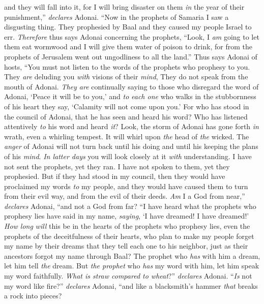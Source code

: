 \begin{biblechapter}
and they will fall into it, 
for I will bring disaster on them \textit{in} the year of their punishment,” \textit{declares} Adonai.
\verse “Now in the prophets of Samaria I saw a disgusting thing. 
They prophesied by Baal and they caused my people Israel to err.
\verse \textit{Therefore} thus says Adonai concerning the prophets, “Look, I \textit{am} going to let them eat wormwood 
and I will give them water of poison to drink, 
for from the prophets of Jerusalem 
went out ungodliness to all the land.”
\verse Thus says Adonai of hosts,
\verse “You must not listen to the words of the prophets who prophesy to you. 
They \textit{are} deluding you \textit{with} visions of their \textit{mind}, 
They do not speak from the mouth of Adonai.
\verse \textit{They are} continually saying to those who disregard the word of Adonai, 
‘Peace it will be to you,’ 
and \textit{to} \textit{each one} who walks in the stubbornness of his heart they say, 
‘Calamity will not come upon you.’
\verse For who has stood in the council of Adonai, 
that he has seen and heard his word? 
Who has listened attentively \textit{to} his word 
and heard \textit{it}?
\verse Look, the storm of Adonai has gone forth \textit{in} wrath, 
even a whirling tempest. 
It will whirl upon \textit{the} head of \textit{the} wicked.
\verse The \textit{anger} of Adonai will not turn back 
until his doing and until his keeping the plans of his \textit{mind}. 
\textit{In latter days} you will look closely at it \textit{with} understanding.
\verse I have not sent the prophets, yet they ran. 
I have not spoken to them, yet they prophesied.
\verse But if they had stood in my council, 
then they would have proclaimed my words \textit{to} my people, 
and they would have caused them to turn from their evil way, 
and from the evil of their deeds.
\verse \textit{Am} I a God from near,” \textit{declares} Adonai, 
“and not a God from far?
\verse “I have heard what the prophets who prophesy lies have said in my name, \textit{saying}, ‘I have dreamed! I have dreamed!’
\verse \textit{How long} \textit{will} this be in the hearts of the prophets who prophesy lies, even the prophets of the deceitfulness of their hearts,
\verse who plan to make my people forget my name by their dreams that they tell each one to his neighbor, just as their ancestors forgot my name through Baal?
\verse The prophet who \textit{has} with him a dream, let him tell \textit{the} dream. But \textit{the prophet} who \textit{has} my word with him, let him speak my word faithfully. \textit{What is straw compared to wheat}?” \textit{declares} Adonai.
\verse “\textit{Is} not my word like fire?” \textit{declares} Adonai, “and like a blacksmith’s hammer \textit{that} breaks a rock into pieces?

\end{biblechapter}
